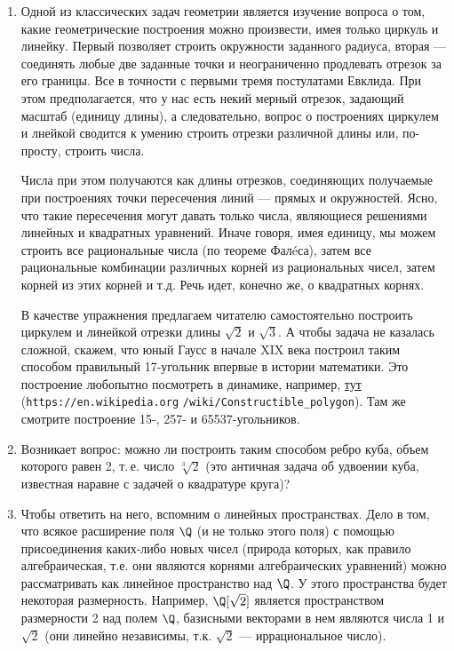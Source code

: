\begin{enumerate}
\item Одной из классических задач геометрии является изучение вопроса о том, какие геометрические построения можно произвести, имея только циркуль и линейку. Первый позволяет строить окружности заданного радиуса, вторая --- соединять любые две заданные точки и неограниченно продлевать отрезок за его границы. Все в точности с первыми тремя постулатами Евклида. При этом предполагается, что у нас есть некий мерный отрезок, задающий масштаб (единицу длины), а следовательно, вопрос о построениях циркулем и лнейкой сводится к умению строить отрезки различной длины или, по-просту, строить числа.

Числа при этом получаются как длины отрезков, соединяющих получаемые при построениях точки пересечения линий --- прямых и окружностей. Ясно, что такие пересечения могут давать только числа, являющиеся решениями линейных и квадратных уравнений. Иначе говоря, имея единицу, мы можем строить все рациональные числа (по теореме Фал\'eса), затем все рациональные комбинации различных корней из рациональных чисел, затем корней из этих корней и т.д. Речь идет, конечно же, о квадратных корнях.

В качестве упражнения предлагаем читателю самостоятельно построить циркулем и линейкой отрезки длины $\sqrt 2$ и $\sqrt 3$. А чтобы задача не казалась сложной, скажем, что юный Гаусс в начале XIX века построил таким способом правильный 17-угольник впервые в истории математики. Это построение любопытно посмотреть в динамике, например, \href{https://en.wikipedia.org/wiki/Constructible_polygon}{тут} (\verb|https://en.wikipedia.org| \verb|/wiki/Constructible_polygon|). Там же смотрите построение 15-, 257- и 65537-угольников.

\item Возникает вопрос: можно ли построить таким способом ребро куба, объем которого равен 2, т.\,е. число $\sqrt[3]{2}$ (это  античная задача об удвоении куба, известная наравне с задачей о квадратуре круга)?

\item Чтобы ответить на него, вспомним о линейных пространствах. Дело в том, что всякое расширение поля $\Q$ (и не только этого поля) с помощью присоединения каких-либо новых чисел (природа которых, как правило алгебраическая, т.е. они являются корнями алгебраических уравнений) можно рассматривать как линейное пространство над $\Q$. У этого пространства будет некоторая размерность. Например, $\Q[\sqrt 2]$ является пространством размерности 2 над полем $\Q$, базисными векторами в нем являются числа 1 и $\sqrt 2$ (они линейно независимы, т.к. $\sqrt 2$ --- иррациональное число).


\end{enumerate}
